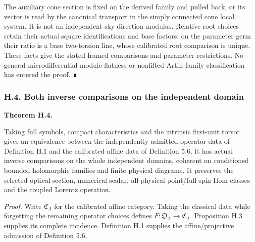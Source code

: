 \documentclass[
  english,
  11pt,
  reqno]{amsart}
\makeatletter
\newcommand{\pandocstatementheading}[1]{%
  \par\addpenalty{\@beginparpenalty}%
  \addvspace{.5\baselineskip plus .2\baselineskip minus .2\baselineskip}%
  {\normalfont\bfseries #1\par}%
  \nobreak\@afterindenttrue\@afterheading
}
\makeatother
\begin{document}
The auxiliary cone section is fixed on the derived family and pulled
back, or its vector is read by the canonical transport in the simply
connected cone local system. It is not an independent sky-direction
modulus. Relative root choices retain their actual square
identifications and base factors; on the parameter germ their ratio is a
base two-torsion line, whose calibrated root comparison is unique. These
facts give the stated framed comparisons and parameter restrictions. No
general microdifferential-module flatness or nonlifted Artin-family
classification has entered the proof. ∎

\protect{}\label{sec:gg-independent-op-equivalence}

\subsubsection{H.4. Both inverse comparisons on the independent
domain}\label{h.4.-both-inverse-comparisons-on-the-independent-domain}

\pandocstatementheading{\protect{}\label{thm:gg-independent-op-equivalence}Theorem H.4.}

Taking full symbols, compact characteristics and the intrinsic
first-unit torsor gives an equivalence between the independently
admitted operator data of Definition H.1 and the calibrated affine data
of Definition 5.6. It has actual inverse comparisons on the whole
independent domains, coherent on conditioned bounded holomorphic
families and finite physical diagrams. It preserves the selected optical
section, numerical scalar, all physical point/full-spin Hom classes and
the coupled Lorentz operation.

\emph{Proof.} Write \(\mathfrak C_\Lambda\) for the calibrated affine
category. Taking the classical data while forgetting the remaining
operator choices defines
\(F:\mathfrak O_\Lambda\to\mathfrak C_\Lambda\). Proposition H.3
supplies its complete incidence. Definition H.1 supplies the
affine/projective admission of Definition 5.6.
\end{document}
